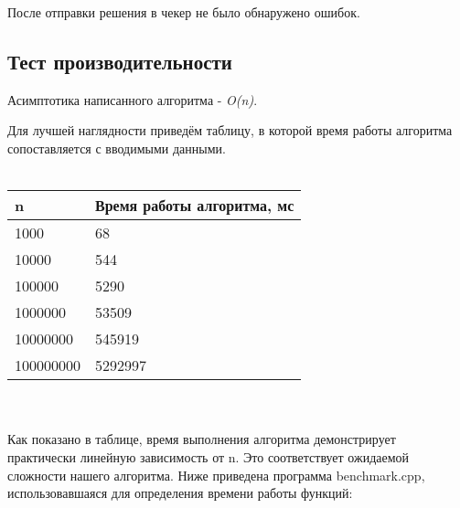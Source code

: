 \documentclass[12pt]{article}
\begin{document}
После отправки решения в чекер не было обнаружено ошибок.

\subsection*{Тест производительности}
Асимптотика написанного алгоритма - \textit{O(n)}.

Для лучшей наглядности приведём таблицу, в которой время работы алгоритма сопоставляется с вводимыми данными.
\\
\\
\begin{tabularx}{\textwidth}{ |X|X| }
    \hline
    n & Время работы алгоритма, мс \\
    \hline
    1000 & 68 \\
    10000 & 544 \\
    100000 & 5290 \\
    1000000 & 53509 \\
    10000000 & 545919 \\
    100000000 & 5292997 \\
    \hline
\end{tabularx}
\\
\\
Как показано в таблице, время выполнения алгоритма демонстрирует практически линейную зависимость от n. Это соответствует ожидаемой сложности нашего алгоритма. 
Ниже приведена программа benchmark.cpp, использовавшаяся для определения времени работы функций:
\end{document}
